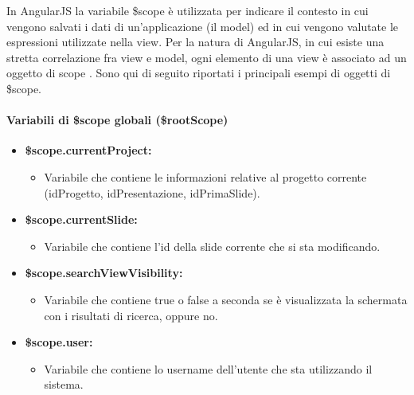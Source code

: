 In AngularJS la variabile \$scope è utilizzata per indicare il contesto in cui vengono salvati i dati di un’applicazione (il model) ed in cui vengono valutate le espressioni utilizzate nella view.
Per la natura di AngularJS, in cui esiste una stretta correlazione fra view e model, ogni elemento di una view è associato ad un oggetto di scope .
Sono qui di seguito riportati i principali esempi di oggetti di \$scope.

\paragraph{Variabili di \$scope globali (\$rootScope)}
\begin{itemize}
\item \textbf{\$scope.currentProject:}
\begin{itemize}
	\item Variabile che contiene le informazioni relative al progetto corrente (idProgetto, idPresentazione, idPrimaSlide).
\end{itemize}

\item \textbf{\$scope.currentSlide:}
\begin{itemize}
	\item Variabile che contiene l'id della slide corrente che si sta modificando.
\end{itemize}

\item \textbf{\$scope.searchViewVisibility:}
\begin{itemize}
	\item Variabile che contiene true o false a seconda se è visualizzata la schermata con i risultati di ricerca, oppure no.
\end{itemize}

\item \textbf{\$scope.user:}
\begin{itemize}
	\item Variabile che contiene lo username dell'utente che sta utilizzando il sistema.
\end{itemize}
\end{itemize}



